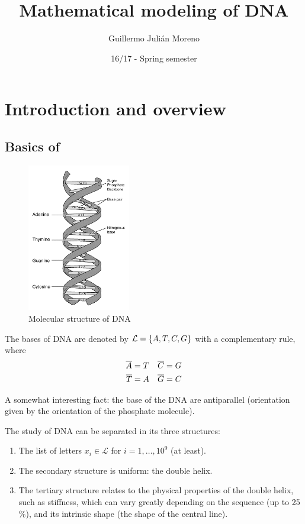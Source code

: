 \documentclass[palatino]{epflnotes}
\title{Mathematical modeling of DNA}
\author{Guillermo Julián Moreno}
\date{16/17 - Spring semester}
\begin{document}
\frontmatter
\pagestyle{plain}
\maketitle

\tableofcontents
\mainmatter

\chapter{Introduction and overview}

\section{Basics of }

\begin{figure}
\centering
\includegraphics[width = 0.4\textwidth]{img/DNA-structure-and-bases.png}
\caption{Molecular structure of DNA}
\label{fig:DNA}
\end{figure}

The bases of DNA are denoted by $\mathcal{L} = \set{A,T,C,G}$ with a complementary  rule, where \begin{align*}
\overline{A} &= T &\overline{C} &= G \\
\overline{T} &= A &\overline{G} &= C
\end{align*}

A somewhat interesting fact: the base of the DNA are antiparallel (orientation given by the orientation of the phosphate molecule).

The study of DNA can be separated in its three structures:
\begin{enumerate}
	\item The list of letters $x_i ∈ \mathcal{L} $ for $i = 1, \dotsc, 10^9$ (at least).
	\item The secondary structure is uniform: the double helix.
	\item The tertiary structure relates to the physical properties of the double helix, such as stiffness, which can vary greatly depending on the sequence (up to 25 \%), and its intrinsic shape (the shape of the central line).
\end{enumerate}
\end{document}

